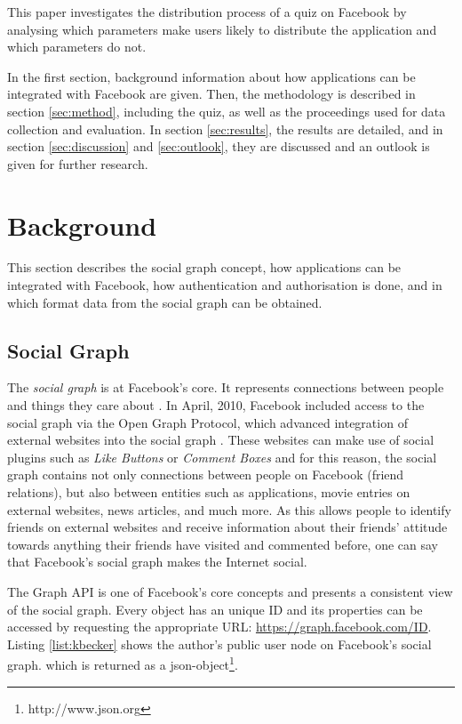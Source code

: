 \documentclass[preprint,12pt]{elsarticle}
\begin{document}
This paper investigates the distribution process of a quiz on Facebook
by analysing which parameters make users likely to distribute the application
and which parameters do not. 

In the first section, background information
about how applications can be integrated with Facebook are
given. Then, the methodology is described in section \ref{sec:method},
including the quiz, as well as the 
proceedings used for data collection and evaluation. In section
\ref{sec:results}, the results are detailed, and in section
\ref{sec:discussion} and \ref{sec:outlook}, they are discussed and an
outlook is given for further research. 


\section{Background}
\label{sec:background}
This section describes the social graph concept, how applications can be integrated with
Facebook, how authentication and authorisation is done, and in which
format data from the social graph can be obtained.

\subsection{Social Graph}
\label{sec:social-graph}
The \textit{social graph} is at Facebook's core. It represents
connections between people and things they care about
\cite{facebookDev}. In April, 2010, Facebook included access to the
social graph via the Open Graph Protocol, which advanced integration of
external websites into the social graph \cite{facebookDev2}. These websites can make use of
social plugins such as \textit{Like Buttons} or \textit{Comment Boxes} \cite{facebookDev2}
and for this reason, the social graph contains not only connections between
people on Facebook (friend relations), but also between 
entities such as applications, movie entries on external websites,
news articles, and much more. As this allows
people to identify friends on external websites and receive
information about their friends' attitude towards anything their
friends have visited and commented before, one can say
that Facebook's social graph makes the Internet social.  

The Graph API is one of Facebook's core concepts and presents a consistent
view of the social graph. Every object has an unique ID and its
properties can be accessed by requesting the appropriate URL:
\url{https://graph.facebook.com/ID}. Listing \ref{list:kbecker} shows
the author's public user node on Facebook's social graph. which is
returned as a \ac{json}-object\footnote{http://www.json.org}.
\end{document}

